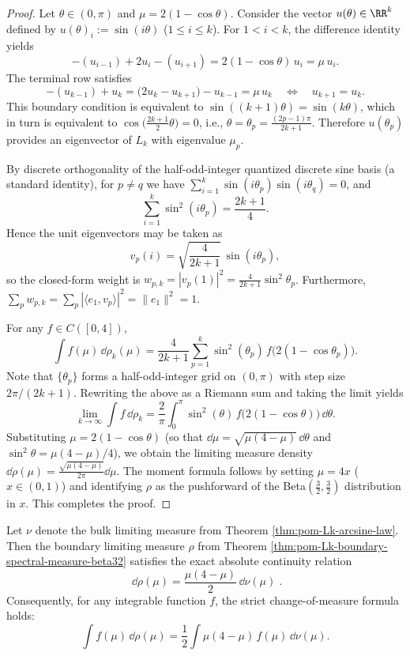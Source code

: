 \begin{proof}
Let \(\theta\in(0,\pi)\) and \(\mu=2(1-\cos\theta)\).
Consider the vector \(u(\theta)\in\RR^k\) defined by
\(
u(\theta)_i:=\sin(i\theta)
\)
(\(1\le i\le k\)).
For \(1<i<k\), the difference identity yields
\[
-(u_{i-1})+2u_i-(u_{i+1})
=2(1-\cos\theta)\,u_i=\mu\,u_i.
\]
The terminal row satisfies
\[
-(u_{k-1})+u_k
=\bigl(2u_k-u_{k+1}\bigr)-u_{k-1}
=\mu\,u_k\quad\Longleftrightarrow\quad u_{k+1}=u_k.
\]
This boundary condition is equivalent to \(\sin((k+1)\theta)=\sin(k\theta)\), which in turn is equivalent to \(\cos\!\bigl(\tfrac{2k+1}{2}\theta\bigr)=0\), i.e.,
\(\theta=\theta_p=\frac{(2p-1)\pi}{2k+1}\).
Therefore \(u(\theta_p)\) provides an eigenvector of \(L_k\) with eigenvalue \(\mu_p\).
\par
By discrete orthogonality of the half-odd-integer quantized discrete sine basis (a standard identity), for \(p\neq q\) we have
\(
\sum_{i=1}^{k}\sin(i\theta_p)\sin(i\theta_q)=0
\), and
\[
\sum_{i=1}^{k}\sin^2(i\theta_p)=\frac{2k+1}{4}.
\]
Hence the unit eigenvectors may be taken as
\[
v_p(i)=\sqrt{\frac{4}{2k+1}}\,\sin(i\theta_p),
\]
so the closed-form weight is
\(
w_{p,k}=|v_p(1)|^2=\frac{4}{2k+1}\sin^2\theta_p
\).
Furthermore, \(\sum_{p}w_{p,k}=\sum_{p}|\langle e_1,v_p\rangle|^2=\|e_1\|^2=1\).
\par
For any \(f\in C([0,4])\),
\[
\int f(\mu)\,\dd\rho_k(\mu)
=\frac{4}{2k+1}\sum_{p=1}^{k}\sin^2(\theta_p)\,f\!\bigl(2(1-\cos\theta_p)\bigr).
\]
Note that \(\{\theta_p\}\) forms a half-odd-integer grid on \((0,\pi)\) with step size \(2\pi/(2k+1)\).
Rewriting the above as a Riemann sum and taking the limit yields
\[
\lim_{k\to\infty}\int f\,\dd\rho_k
=\frac{2}{\pi}\int_0^\pi \sin^2(\theta)\,f\!\bigl(2(1-\cos\theta)\bigr)\,\dd\theta.
\]
Substituting \(\mu=2(1-\cos\theta)\) (so that \(\dd\mu=\sqrt{\mu(4-\mu)}\,\dd\theta\) and \(\sin^2\theta=\mu(4-\mu)/4\)), we obtain the limiting measure density
\(
\dd\rho(\mu)=\frac{\sqrt{\mu(4-\mu)}}{2\pi}\dd\mu
\).
The moment formula follows by setting \(\mu=4x\) (\(x\in(0,1)\)) and identifying \(\rho\) as the pushforward of the Beta\((\tfrac32,\tfrac32)\) distribution in \(x\). This completes the proof.
\end{proof}

\begin{corollary}\label{cor:pom-Lk-boundary-bulk-radon-nikodym}
Let \(\nu\) denote the bulk limiting measure from Theorem \ref{thm:pom-Lk-arcsine-law}.
Then the boundary limiting measure \(\rho\) from Theorem \ref{thm:pom-Lk-boundary-spectral-measure-beta32} satisfies the exact absolute continuity relation
\[
\boxed{\;
\dd\rho(\mu)=\frac{\mu(4-\mu)}{2}\,\dd\nu(\mu)\; }.
\]
Consequently, for any integrable function \(f\), the strict change-of-measure formula holds:
\[
\int f(\mu)\,\dd\rho(\mu)=\frac12\int \mu(4-\mu)\,f(\mu)\,\dd\nu(\mu).
\]
\end{corollary}

